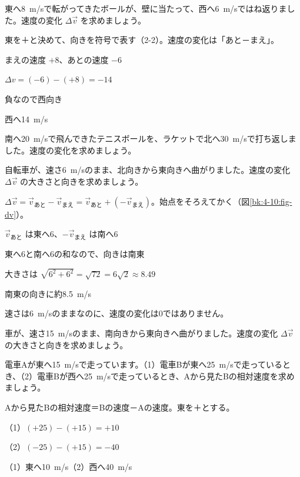 \begin{reidai}[一直線上の速度の変化]
東へ\qty{8}{m/s}で転がってきたボールが、壁に当たって、西へ\qty{6}{m/s}ではね返りました。速度の変化 $\Delta\vec{v}$ を求めましょう。\par
\kangaekata 東を＋と決めて、向きを符号で表す（2-2）。速度の変化は「あと－まえ」。\par
\shiki まえの速度 $+8$、あとの速度 $-6$\par
\hspace*{2.6\zw}$\Delta v=(-6)-(+8)=-14$\par
\hspace*{2.6\zw}負なので西向き\par
\kotae 西へ\qty{14}{m/s}
\end{reidai}

\begin{jibun}
南へ\qty{20}{m/s}で飛んできたテニスボールを、ラケットで北へ\qty{30}{m/s}で打ち返しました。速度の変化を求めましょう。
\end{jibun}

\begin{reidai}[向きが変わったときの速度の変化]
自転車が、速さ\qty{6}{m/s}のまま、北向きから東向きへ曲がりました。速度の変化 $\Delta\vec{v}$ の大きさと向きを求めましょう。\par
\kangaekata $\Delta\vec{v}=\vec{v}_{\text{あと}}-\vec{v}_{\text{まえ}}=\vec{v}_{\text{あと}}+(-\vec{v}_{\text{まえ}})$。始点をそろえてかく（図\ref{bk:4-10:fig-dv}）。\par
\shiki $\vec{v}_{\text{あと}}$ は東へ6、$-\vec{v}_{\text{まえ}}$ は南へ6\par
\hspace*{2.6\zw}東へ6と南へ6の和なので、向きは南東\par
\hspace*{2.6\zw}大きさは $\sqrt{6^2+6^2}=\sqrt{72}=6\sqrt2\approx8.49$\par
\kotae 南東の向きに約\qty{8.5}{m/s}
\end{reidai}
速さは\qty{6}{m/s}のままなのに、速度の変化は0ではありません。

\begin{jibun}
車が、速さ\qty{15}{m/s}のまま、南向きから東向きへ曲がりました。速度の変化 $\Delta\vec{v}$ の大きさと向きを求めましょう。
\end{jibun}

\begin{reidai}[電車から見た電車の速度]
電車Aが東へ\qty{15}{m/s}で走っています。（1）電車Bが東へ\qty{25}{m/s}で走っているとき、（2）電車Bが西へ\qty{25}{m/s}で走っているとき、Aから見たBの相対速度を求めましょう。\par
\kangaekata Aから見たBの相対速度＝Bの速度－Aの速度。東を＋とする。\par
\shiki（1）$(+25)-(+15)=+10$\par
\hspace*{2.6\zw}（2）$(-25)-(+15)=-40$\par
\kotae （1）東へ\qty{10}{m/s}\quad（2）西へ\qty{40}{m/s}
\end{reidai}

